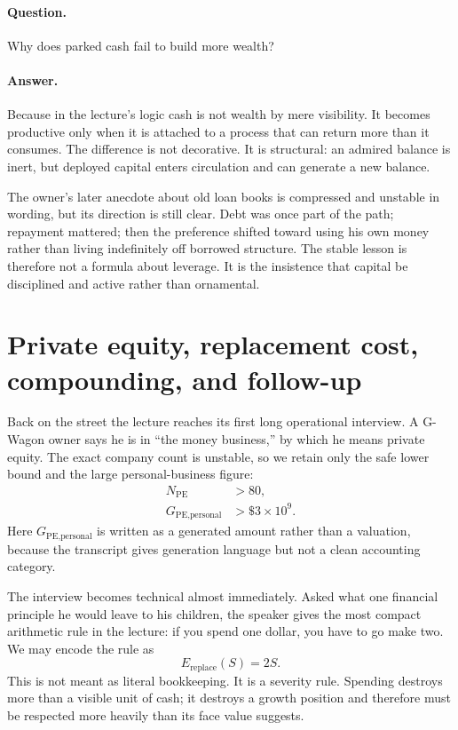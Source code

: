 \paragraph{Question.} Why does parked cash fail to build more wealth?

\paragraph{Answer.} Because in the lecture's logic cash is not wealth by mere visibility. It becomes productive only when it is attached to a process that can return more than it consumes. The difference is not decorative. It is structural: an admired balance is inert, but deployed capital enters circulation and can generate a new balance.

The owner's later anecdote about old loan books is compressed and unstable in wording, but its direction is still clear. Debt was once part of the path; repayment mattered; then the preference shifted toward using his own money rather than living indefinitely off borrowed structure. The stable lesson is therefore not a formula about leverage. It is the insistence that capital be disciplined and active rather than ornamental.

\section{Private equity, replacement cost, compounding, and follow-up}

Back on the street the lecture reaches its first long operational interview. A G-Wagon owner says he is in ``the money business,'' by which he means private equity. The exact company count is unstable, so we retain only the safe lower bound and the large personal-business figure:
\begin{align}
N_{\text{PE}} &> 80,\\
G_{\text{PE,personal}} &> \$3\times 10^{9}.
\end{align}
Here \(G_{\text{PE,personal}}\) is written as a generated amount rather than a valuation, because the transcript gives generation language but not a clean accounting category.

The interview becomes technical almost immediately. Asked what one financial principle he would leave to his children, the speaker gives the most compact arithmetic rule in the lecture: if you spend one dollar, you have to go make two. We may encode the rule as
\begin{equation}
E_{\text{replace}}(S)=2S.
\end{equation}
This is not meant as literal bookkeeping. It is a severity rule. Spending destroys more than a visible unit of cash; it destroys a growth position and therefore must be respected more heavily than its face value suggests.

